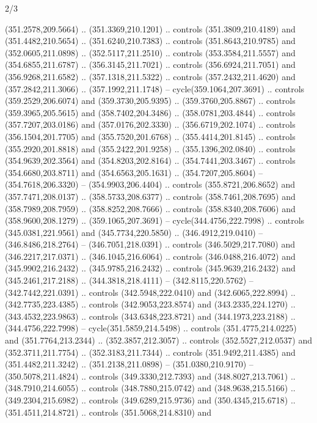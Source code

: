 \begin{flagdescription}{2/3}
\begin{scope}[xshift=0.5\flaglength,yshift=0.5\flagwidth,scale=\flagwidth/495.65]
\begin{scope}[y=0.8pt, x=0.8pt, yscale=-1,shift={(-463.76,-309.78)}]
  (351.2578,209.5664) .. (351.3369,210.1201) .. controls (351.3809,210.4189) and
  (351.4482,210.5654) .. (351.6240,210.7383) .. controls (351.8643,210.9785) and
  (352.0605,211.0898) .. (352.5117,211.2510) .. controls (353.3584,211.5557) and
  (354.6855,211.6787) .. (356.3145,211.7021) .. controls (356.6924,211.7051) and
  (356.9268,211.6582) .. (357.1318,211.5322) .. controls (357.2432,211.4620) and
  (357.2842,211.3066) .. (357.1992,211.1748) -- cycle(359.1064,207.3691) ..
  controls (359.2529,206.6074) and (359.3730,205.9395) .. (359.3760,205.8867) ..
  controls (359.3965,205.5615) and (358.7402,204.3486) .. (358.0781,203.4844) ..
  controls (357.7207,203.0186) and (357.0176,202.3330) .. (356.6719,202.1074) ..
  controls (356.1504,201.7705) and (355.7520,201.6768) .. (355.4414,201.8145) ..
  controls (355.2920,201.8818) and (355.2422,201.9258) .. (355.1396,202.0840) ..
  controls (354.9639,202.3564) and (354.8203,202.8164) .. (354.7441,203.3467) ..
  controls (354.6680,203.8711) and (354.6563,205.1631) .. (354.7207,205.8604) --
  (354.7618,206.3320) -- (354.9903,206.4404) .. controls (355.8721,206.8652) and
  (357.7471,208.0137) .. (358.5733,208.6377) .. controls (358.7461,208.7695) and
  (358.7989,208.7959) .. (358.8252,208.7666) .. controls (358.8340,208.7606) and
  (358.9600,208.1279) .. (359.1065,207.3691) -- cycle(344.4756,222.7998) ..
  controls (345.0381,221.9561) and (345.7734,220.5850) .. (346.4912,219.0410) --
  (346.8486,218.2764) -- (346.7051,218.0391) .. controls (346.5029,217.7080) and
  (346.2217,217.0371) .. (346.1045,216.6064) .. controls (346.0488,216.4072) and
  (345.9902,216.2432) .. (345.9785,216.2432) .. controls (345.9639,216.2432) and
  (345.2461,217.2188) .. (344.3818,218.4111) -- (342.8115,220.5762) --
  (342.7442,221.0391) .. controls (342.5948,222.0410) and (342.6065,222.8994) ..
  (342.7735,223.4385) .. controls (342.9053,223.8574) and (343.2335,224.1270) ..
  (343.4532,223.9863) .. controls (343.6348,223.8721) and (344.1973,223.2188) ..
  (344.4756,222.7998) -- cycle(351.5859,214.5498) .. controls
  (351.4775,214.0225) and (351.7764,213.2344) .. (352.3857,212.3057) .. controls
  (352.5527,212.0537) and (352.3711,211.7754) .. (352.3183,211.7344) .. controls
  (351.9492,211.4385) and (351.4482,211.3242) .. (351.2138,211.0898) --
  (351.0380,210.9170) -- (350.5078,211.4824) .. controls (349.3330,212.7393) and
  (348.8027,213.7061) .. (348.7910,214.6055) .. controls (348.7880,215.0742) and
  (348.9638,215.5166) .. (349.2304,215.6982) .. controls (349.6289,215.9736) and
  (350.4345,215.6718) .. (351.4511,214.8721) .. controls (351.5068,214.8310) and

\end{scope}
\end{scope}
\end{flagdescription}
